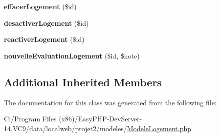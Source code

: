 \begin{DoxyCompactItemize}
\item 
\mbox{\label{class_modele_logement_a08f1960d3d38cc33c5ad6c386ffd3bee}} 
{\bfseries effacer\+Logement} (\$id)
\item 
\mbox{\label{class_modele_logement_ac9f670d8499552ed060c04278c208b28}} 
{\bfseries desactiver\+Logement} (\$id)
\item 
\mbox{\label{class_modele_logement_a69cfbf09b36e17b0c368cf81a037de0c}} 
{\bfseries reactiver\+Logement} (\$id)
\item 
\mbox{\label{class_modele_logement_a619ea12d1677ff589a0938d228c1280e}} 
{\bfseries nouvelle\+Evaluation\+Logement} (\$id, \$note)
\end{DoxyCompactItemize}
\subsection*{Additional Inherited Members}


The documentation for this class was generated from the following file\+:\begin{DoxyCompactItemize}
\item 
C\+:/\+Program Files (x86)/\+Easy\+P\+H\+P-\/\+Dev\+Server-\/14.\+V\+C9/data/localweb/projet2/modeles/\hyperlink{_modele_logement_8php}{Modele\+Logement.\+php}\end{DoxyCompactItemize}
